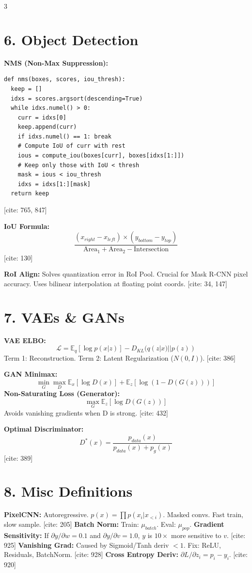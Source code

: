 \documentclass[10pt,landscape]{article}
\newcommand{\E}{\mathbb{E}}
\begin{document}
\begin{multicols*}{3}
\section*{6. Object Detection}
\textbf{NMS (Non-Max Suppression):}
\begin{lstlisting}
def nms(boxes, scores, iou_thresh):
  keep = []
  idxs = scores.argsort(descending=True)
  while idxs.numel() > 0:
    curr = idxs[0]
    keep.append(curr)
    if idxs.numel() == 1: break
    # Compute IoU of curr with rest
    ious = compute_iou(boxes[curr], boxes[idxs[1:]])
    # Keep only those with IoU < thresh
    mask = ious < iou_thresh
    idxs = idxs[1:][mask]
  return keep
\end{lstlisting}
[cite: 765, 847]

\textbf{IoU Formula:}
$$ \frac{(x_{right} - x_{left}) \times (y_{bottom} - y_{top})}{\text{Area}_1 + \text{Area}_2 - \text{Intersection}} $$
[cite: 130]

\textbf{RoI Align:}
Solves quantization error in RoI Pool.
Crucial for Mask R-CNN pixel accuracy.
Uses bilinear interpolation at floating point coords. [cite: 34, 147]

\section*{7. VAEs \& GANs}

\textbf{VAE ELBO:}
$$ \mathcal{L} = \E_q[\log p(x|z)] - D_{KL}(q(z|x)||p(z)) $$
Term 1: Reconstruction. Term 2: Latent Regularization ($N(0,I)$). [cite: 386]

\textbf{GAN Minimax:}
$$ \min_G \max_D \E_x[\log D(x)] + \E_z[\log(1-D(G(z)))] $$
\textbf{Non-Saturating Loss (Generator):}
$$ \max_G \E_z [\log D(G(z))] $$
Avoids vanishing gradients when D is strong. [cite: 432]

\textbf{Optimal Discriminator:}
$$ D^*(x) = \frac{p_{data}(x)}{p_{data}(x) + p_g(x)} $$
[cite: 389]

\section*{8. Misc Definitions}
\textbf{PixelCNN:} Autoregressive. $p(x) = \prod p(x_i | x_{<i})$. Masked convs. Fast train, slow sample. [cite: 205]
\textbf{Batch Norm:} Train: $\mu_{batch}$. Eval: $\mu_{pop}$.
\textbf{Gradient Sensitivity:} If $\partial y / \partial w = 0.1$ and $\partial y / \partial v = 1.0$, $y$ is $10\times$ more sensitive to $v$. [cite: 925]
\textbf{Vanishing Grad:} Caused by Sigmoid/Tanh deriv $<1$. Fix: ReLU, Residuals, BatchNorm. [cite: 928]
\textbf{Cross Entropy Deriv:} $\partial L / \partial z_i = p_i - y_i$. [cite: 920]

\end{multicols*}
\end{document}
